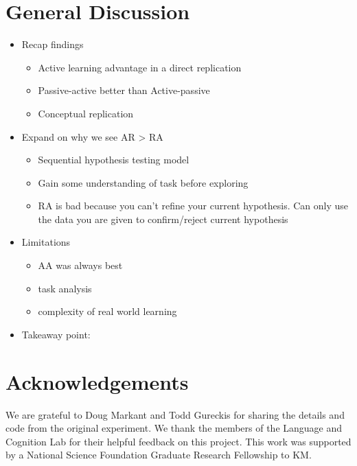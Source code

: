 \documentclass[10pt, letterpaper]{article}
\begin{document}
\section{General Discussion}\label{general-discussion}

\begin{itemize}
\itemsep1pt\parskip0pt
\item
  Recap findings

  \begin{itemize}
  \itemsep1pt\parskip0pt
  \item
    Active learning advantage in a direct replication
  \item
    Passive-active better than Active-passive
  \item
    Conceptual replication
  \end{itemize}
\item
  Expand on why we see AR \textgreater{} RA

  \begin{itemize}
  \itemsep1pt\parskip0pt
  \item
    Sequential hypothesis testing model
  \item
    Gain some understanding of task before exploring
  \item
    RA is bad because you can't refine your current hypothesis. Can only
    use the data you are given to confirm/reject current hypothesis
  \end{itemize}
\item
  Limitations

  \begin{itemize}
  \itemsep1pt\parskip0pt
  \item
    AA was always best
  \item
    task analysis
  \item
    complexity of real world learning
  \end{itemize}
\item
  Takeaway point:
\end{itemize}

\section{Acknowledgements}\label{acknowledgements}

We are grateful to Doug Markant and Todd Gureckis for sharing the
details and code from the original experiment. We thank the members of
the Language and Cognition Lab for their helpful feedback on this
project. This work was supported by a National Science Foundation
Graduate Research Fellowship to KM.
\end{document}
